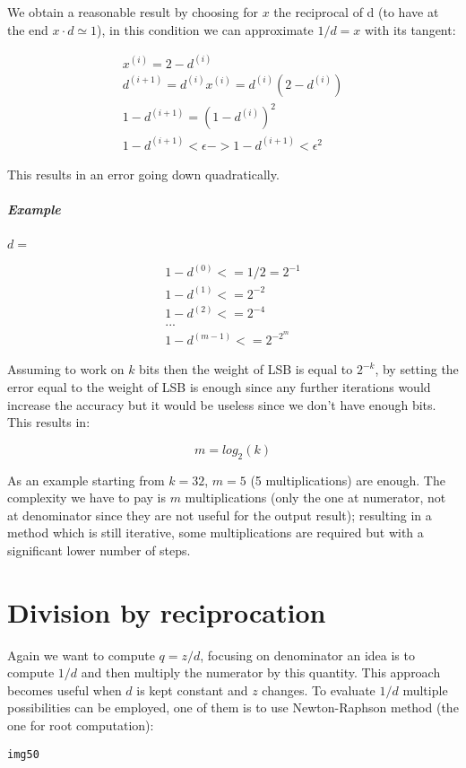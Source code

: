 We obtain a reasonable result by choosing for $x$ the reciprocal of d (to have at the end $x \cdot d \simeq 1$), in this condition we can approximate $1/d=x$ with its tangent:

\begin{eqnarray}
x^{(i)}=2-d^{(i)}\\
d^{(i+1)}=d^{(i)} x^{(i)}=d^{(i)}(2-d^{(i)})\\
1-d^{(i+1)}=(1-d^{(i)})^2\\
1-d^{(i+1)} < \epsilon -> 1-d^{(i+1)} < \epsilon^2
\end{eqnarray}

This results in an error going down quadratically.

\subparagraph{Example}
$d=$

\begin{eqnarray}
1-d^{(0)} <= 1/2 = 2^{-1}\\
1-d^{(1)} <= 2^{-2}\\
1-d^{(2)} <= 2^{-4}\\
...\\
1-d^{(m-1)} <= 2^{-2^m}
\end{eqnarray}

Assuming to work on $k$ bits then the weight of LSB is equal to $2^{-k}$, by setting the error equal to the weight of LSB is enough since any further iterations would increase the accuracy but it would be useless since we don't have enough bits. This results in:

$$m=log_2 (k)$$

As an example starting from $k=32$, $m=5$ (5 multiplications) are enough. The complexity we have to pay is $m$ multiplications (only the one at numerator, not at denominator since they are not useful for the output result); resulting in a method which is still iterative, some multiplications are required but with a significant lower number of steps.

\section{Division by reciprocation}

Again we want to compute $q=z/d$, focusing on denominator an idea is to compute $1/d$ and then multiply the numerator by this quantity. This approach becomes useful when $d$ is kept constant and $z$ changes. To evaluate $1/d$ multiple possibilities can be employed, one of them is to use Newton-Raphson method (the one for root computation):

\begin{verbatim}
img50














\end{verbatim}


